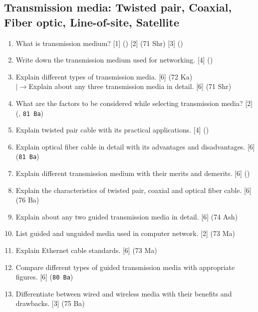 \documentclass[12pt]{article}
\newcommand{\lb}{\\$\left|\rightarrow\right.$}
\begin{document}
	\subsection{Transmission media: Twisted pair, Coaxial, Fiber optic, Line-of-site, Satellite}
		\begin{enumerate}[noitemsep, topsep=0pt]
			\item What is transmission medium?  \hfill [1] () [2] (71 Shr) [3] ()
			
			\item Write down the transmission medium used for networking. \hfill [4] ()
			
			\item Explain different types of transmission media. \hfill [6] (72 Ka)
			\lb Explain about any three transmission media in detail. \hfill [6] (71 Shr)
			
			\item What are the factors to be considered while selecting transmission media? \hfill [2] (, \texttt{81 Ba})

			\item Explain twisted pair cable with its practical applications. \hfill [4] ()	
			
			\item Explain optical fiber cable in detail with its advantages and disadvantages. \hfill [6] (\texttt{81 Ba})
			
			\item Explain different transmission medium with their merits and demerits. \hfill [6] ()
			
			\item Explain the characteristics of twisted pair, coaxial and optical fiber cable. \hfill [6] (76 Ba)
			
			\item Explain about any two guided transmission media in detail. \hfill [6] (74 Ash)	
			
			\item List guided and unguided media used in computer network. \hfill [2] (73 Ma)
			
			\item Explain Ethernet cable standards. \hfill [6] (73 Ma)
			
			\item Compare different types of guided transmission media with appropriate figures. \hfill [6] (\texttt{80 Ba})
			
			\item Differentiate between wired and wireless media with their benefits and drawbacks. \hfill [3] (75 Ba)
			

\end{enumerate}
\end{document}
